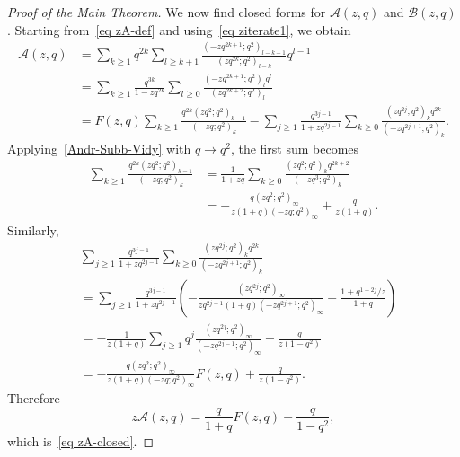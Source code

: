 \documentclass[10pt,a4paper]{amsart}
\numberwithin{equation}{section}
\begin{document}
\begin{proof}[Proof of the Main Theorem]
We now find closed forms for $\mathcal A(z,q)$ and $\mathcal B(z,q)$. Starting from~\eqref{eq zA-def} and using~\eqref{eq ziterate1}, we obtain
\begin{align*}
\mathcal A(z,q)
&=\sum_{k\ge 1} q^{2k}\sum_{l\ge k+1}
\frac{(-zq^{2k+1};q^2)_{l-k-1}}{(zq^{2k};q^2)_{l-k}}q^{l-1}\\
&=\sum_{k\ge 1}\frac{q^{3k}}{1-zq^{2k}}
\sum_{l\ge 0}\frac{(-zq^{2k+1};q^2)_l q^l}{(zq^{2k+2};q^2)_l}\\
&=F(z,q)\sum_{k\ge 1}\frac{q^{2k}(zq^2;q^2)_{k-1}}{(-zq;q^2)_k}
-\sum_{j\ge 1}\frac{q^{3j-1}}{1+zq^{2j-1}}
\sum_{k\ge 0}\frac{(zq^{2j};q^2)_k q^{2k}}{(-zq^{2j+1};q^2)_k}.
\end{align*}
Applying~\eqref{Andr-Subb-Vidy} with $q\to q^2$, the first sum becomes
\begin{align*}
\sum_{k\ge 1}\frac{q^{2k}(zq^2;q^2)_{k-1}}{(-zq;q^2)_k}
&=\frac{1}{1+zq}\sum_{k\ge 0}\frac{(zq^2;q^2)_k q^{2k+2}}{(-zq^3;q^2)_k}\\
&=-\frac{q(zq^2;q^2)_\infty}{z(1+q)(-zq;q^2)_\infty}+\frac{q}{z(1+q)}.
\end{align*}
Similarly,
\begin{align*}
&\sum_{j\ge 1}\frac{q^{3j-1}}{1+zq^{2j-1}}
\sum_{k\ge 0}\frac{(zq^{2j};q^2)_k q^{2k}}{(-zq^{2j+1};q^2)_k} \\
&=\sum_{j\ge 1}\frac{q^{3j-1}}{1+zq^{2j-1}}
\left(
-\frac{(zq^{2j};q^2)_\infty}{zq^{2j-1}(1+q)(-zq^{2j+1};q^2)_\infty}
+\frac{1+q^{1-2j}/z}{1+q}
\right)\\
&=-\frac{1}{z(1+q)}\sum_{j\ge 1}q^j
\frac{(zq^{2j};q^2)_\infty}{(-zq^{2j-1};q^2)_\infty}
+\frac{q}{z(1-q^2)}\\
&=-\frac{q(zq^2;q^2)_\infty}{z(1+q)(-zq;q^2)_\infty}F(z,q)
+\frac{q}{z(1-q^2)}.
\end{align*}
Therefore
\[
z\mathcal A(z,q)=\frac{q}{1+q}F(z,q)-\frac{q}{1-q^2},
\]
which is~\eqref{eq zA-closed}.


\end{proof}
\end{document}
